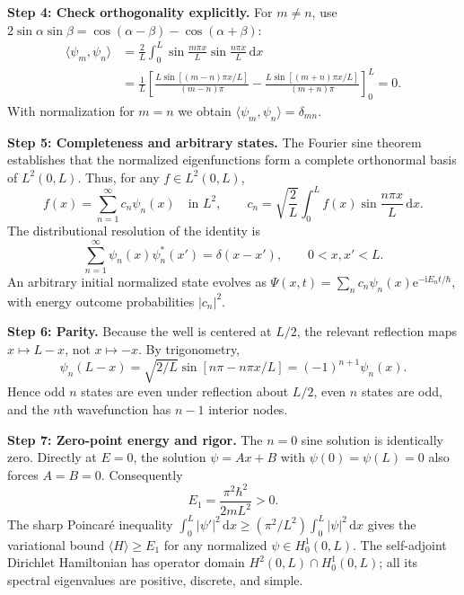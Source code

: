\documentclass[11pt,a4paper]{article}
\newcommand{\dd}{\mathrm{d}}
\newcommand{\iu}{\mathrm{i}}
\newcommand{\ee}{\mathrm{e}}
\newcommand{\abs}[1]{\left|#1\right|}
\begin{document}
\textbf{Step 4: Check orthogonality explicitly.} For $m\ne n$, use $2\sin\alpha\sin\beta=\cos(\alpha-\beta)-\cos(\alpha+\beta)$:
\begin{align}
\langle\psi_m,\psi_n\rangle&=\frac2L\int_0^L\sin\frac{m\pi x}{L}\sin\frac{n\pi x}{L}\,\dd x\\
&=\frac1L\left[\frac{L\sin[(m-n)\pi x/L]}{(m-n)\pi}
-\frac{L\sin[(m+n)\pi x/L]}{(m+n)\pi}\right]_0^L=0.
\end{align}
With normalization for $m=n$ we obtain $\boxed{\langle\psi_m,\psi_n\rangle=\delta_{mn}}$.

\textbf{Step 5: Completeness and arbitrary states.} The Fourier sine theorem establishes that the normalized eigenfunctions form a complete orthonormal basis of $L^2(0,L)$. Thus, for any $f\in L^2(0,L)$,
\begin{equation}
f(x)=\sum_{n=1}^{\infty}c_n\psi_n(x)\quad\text{in }L^2,\qquad c_n=\sqrt{\frac2L}\int_0^L f(x)\sin\frac{n\pi x}{L}\,\dd x.
\end{equation}
The distributional resolution of the identity is
\begin{equation}
\sum_{n=1}^{\infty}\psi_n(x)\psi_n^*(x')=\delta(x-x'),\qquad 0<x,x'<L.
\end{equation}
An arbitrary initial normalized state evolves as $\Psi(x,t)=\sum_nc_n\psi_n(x)\ee^{-\iu E_nt/\hbar}$, with energy outcome probabilities $\abs{c_n}^2$.

\textbf{Step 6: Parity.} Because the well is centered at $L/2$, the relevant reflection maps $x\mapsto L-x$, not $x\mapsto-x$. By trigonometry,
\begin{equation}
\psi_n(L-x)=\sqrt{2/L}\sin[n\pi-n\pi x/L]=(-1)^{n+1}\psi_n(x).
\end{equation}
Hence odd $n$ states are even under reflection about $L/2$, even $n$ states are odd, and the $n$th wavefunction has $n-1$ interior nodes.

\textbf{Step 7: Zero-point energy and rigor.} The $n=0$ sine solution is identically zero. Directly at $E=0$, the solution $\psi=Ax+B$ with $\psi(0)=\psi(L)=0$ also forces $A=B=0$. Consequently
\begin{equation}
\boxed{E_1=\frac{\pi^2\hbar^2}{2mL^2}>0.}
\end{equation}
The sharp Poincar\'e inequality $\int_0^L\abs{\psi'}^2\,\dd x\geq(\pi^2/L^2)\int_0^L\abs\psi^2\,\dd x$ gives the variational bound $\langle H\rangle\geq E_1$ for any normalized $\psi\in H_0^1(0,L)$. The self-adjoint Dirichlet Hamiltonian has operator domain $H^2(0,L)\cap H_0^1(0,L)$; all its spectral eigenvalues are positive, discrete, and simple.
\end{document}
